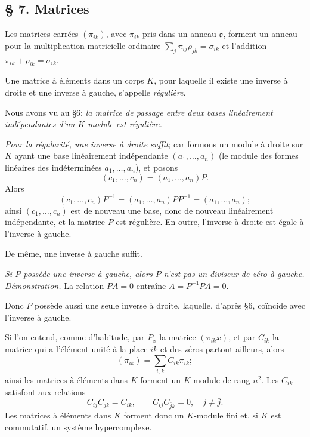 
\providecommand{\mo}{\mathfrak{o}}

\subsection*{\S{} 7. Matrices}

Les matrices carrées $(\pi_{ik})$, avec $\pi_{ik}$ pris dans un anneau $\mo$, forment un anneau pour la multiplication matricielle ordinaire $\sum_j \pi_{ij}\rho_{jk}=\sigma_{ik}$ et l'addition $\pi_{ik}+\rho_{ik}=\sigma_{ik}$.

Une matrice à éléments dans un corps $K$, pour laquelle il existe une inverse à droite et une inverse à gauche, s'appelle \emph{régulière}.

Nous avons vu au \S{}6: \emph{la matrice de passage entre deux bases linéairement indépendantes d'un $K$-module est régulière.}

\emph{Pour la régularité, une inverse à droite suffit}; car formons un module à droite sur $K$ ayant une base linéairement indépendante $(a_1,\ldots,a_n)$ (le module des formes linéaires des indéterminées $a_1,\ldots,a_n$), et posons
\[
        (c_1,\ldots,c_n)=(a_1,\ldots,a_n)P.
\]
Alors
\[
        (c_1,\ldots,c_n)P^{-1}=(a_1,\ldots,a_n)PP^{-1}=(a_1,\ldots,a_n);
\]
ainsi $(c_1,\ldots,c_n)$ est de nouveau une base, donc de nouveau linéairement indépendante, et la matrice $P$ est régulière. En outre, l'inverse à droite est égale à l'inverse à gauche.

De même, une inverse à gauche suffit.

\emph{Si $P$ possède une inverse à gauche, alors $P$ n'est pas un diviseur de zéro à gauche.}
\emph{Démonstration.} La relation $PA=0$ entraîne $A=P^{-1}PA=0$.

Donc $P$ possède aussi une seule inverse à droite, laquelle, d'après \S{}6, coïncide avec l'inverse à gauche.

Si l'on entend, comme d'habitude, par $P_x$ la matrice $(\pi_{ik}x)$, et par $C_{ik}$ la matrice qui a l'élément unité à la place $ik$ et des zéros partout ailleurs, alors
\[
        (\pi_{ik})=\sum_{i,k} C_{ik}\pi_{ik};
\]
ainsi les matrices à éléments dans $K$ forment un $K$-module de rang $n^2$. Les $C_{ik}$ satisfont aux relations
\[
        C_{ij}C_{jk}=C_{ik},
        \qquad
        C_{ij}C_{\bar j k}=0,\quad j\ne\bar j.
\]
Les matrices à éléments dans $K$ forment donc un $K$-module fini et, si $K$ est commutatif, un système hypercomplexe.
